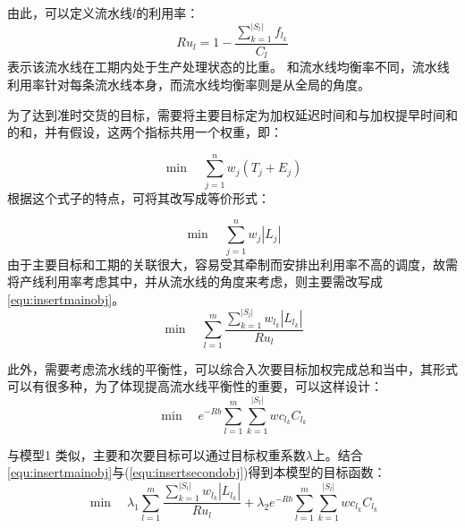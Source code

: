 由此，可以定义流水线$l$的利用率：
\[
Ru_l = 1 - \frac{\sum_{k=1}^{|S_l|}f_{l_k}}{C_l}
\]
表示该流水线在工期内处于生产处理状态的比重。
和流水线均衡率不同，流水线利用率针对每条流水线本身，而流水线均衡率则是从全局的角度。

为了达到准时交货的目标，需要将主要目标定为加权延迟时间和与加权提早时间和的和，并有假设，这两个指标共用一个权重，即：

\[
\min \quad \sum_{j = 1}^n w_j(T_j + E_j)
\]
根据这个式子的特点，可将其改写成等价形式：

\[
\min \quad \sum_{j = 1}^n w_j|L_j|
\]
由于主要目标和工期的关联很大，容易受其牵制而安排出利用率不高的调度，故需将产线利用率考虑其中，并从流水线的角度来考虑，则主要需改写成\eqref{equ:insertmainobj}。
\begin{equation}
\min \quad \sum_{l = 1}^m\frac{\sum_{k=1}^{|S_l|} w_{l_k}|L_{l_k}|}{Ru_l}\label{equ:insertmainobj}
\end{equation}

此外，需要考虑流水线的平衡性，可以综合入次要目标加权完成总和当中，其形式可以有很多种，为了体现提高流水线平衡性的重要，可以这样设计：
\begin{equation}
\min \quad e^{-Rb}\sum_{l=1}^m\sum_{k=1}^{|S_l|}wc_{l_k}C_{l_k}
\label{equ:insertsecondobj}
\end{equation}

与模型1 类似，主要和次要目标可以通过目标权重系数$\lambda$上。结合\eqref{equ:insertmainobj}与(\ref{equ:insertsecondobj})得到本模型的目标函数：
\begin{equation}
\min \quad \lambda_1\sum_{l = 1}^m\frac{\sum_{k=1}^{|S_l|}w_{l_k}|L_{l_k}|}{Ru_l} + \lambda_2 e^{- Rb}\sum_{l=1}^m\sum_{k=1}^{|S_l|}wc_{l_k}C_{l_k}
\label{equ:insertobj}
\end{equation}

